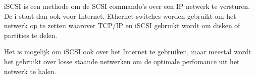 iSCSI is een methode om de SCSI commando's over een IP netwerk te versturen. De i staat dan ook voor Internet. Ethernet switches worden gebruikt om het netwerk op te zetten waarover TCP/IP en iSCSI gebruikt wordt om disken of partities te delen.

Het is mogelijk om iSCSI ook over het Internet te gebruiken, maar meestal wordt het gebruikt over losse staande netwerken om de optimale perfomance uit het netwerk te halen.
